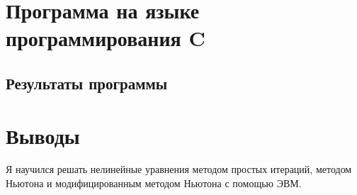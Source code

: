 \documentclass[utf8x, 14pt, oneside, a4paper]{article}
\begin{document}
\clearpage
\section{Программа на языке программирования C}



\subsection{Результаты программы}



\section{Выводы}

Я научился решать нелинейные уравнения методом простых итераций,
методом Ньютона и модифицированным методом Ньютона с помощью ЭВМ.
\end{document}
